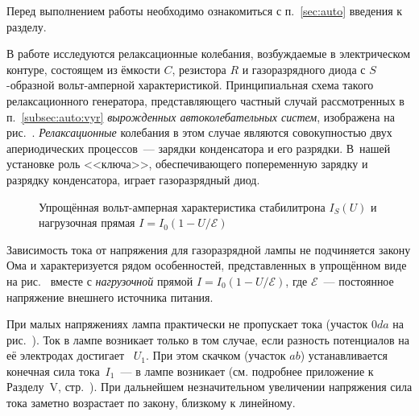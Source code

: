 


Перед выполнением работы необходимо ознакомиться с п.~\ref{sec:auto} 
введения к разделу.

В работе исследуются релаксационные колебания, возбуждаемые в электрическом
контуре, состоящем из ёмкости $C$, резистора $R$ и газоразрядного диода 
с $S$-образной вольт-амперной характеристикой. 
Принципиальная схема такого релаксационного генератора, представляющего 
частный случай рассмотренных в п.~\ref{subsec:auto:vyr}
\emph{вырожденных автоколебательных систем},
изображена на рис.~. \emph{Релаксационные} колебания в этом
случае являются совокупностью двух апериодических процессов~--- зарядки 
конденсатора и его разрядки. В~нашей установке роль <<ключа>>, обеспечивающего
попеременную зарядку и разрядку конденсатора, играет газоразрядный диод.

\begin{figure}[h!]
    \centering
    \caption{Упрощённая вольт-амперная характеристика стабилитрона $I_S(U)$
        и нагрузочная прямая $I=I_0(1-U/\mathcal{E})$}
\end{figure}

Зависимость тока от напряжения для газоразрядной лампы не подчиняется
закону Ома и характеризуется рядом особенностей, представленных
в упрощённом виде на рис.~ вместе с \emph{нагрузочной} прямой
$I=I_0 (1-U/\mathcal{E})$, где $\mathcal{E}$~--- постоянное напряжение 
внешнего источника питания.


При малых напряжениях лампа практически не пропускает тока 
(участок $0da$ на рис.~).
Ток в лампе возникает только в том случае, если разность потенциалов на её
электродах достигает ~$U_1$. 
При этом скачком (участок $ab$) устанавливается конечная 
сила тока~$I_1$~--- в лампе возникает
 (см. подробнее приложение к Разделу~V,
стр.~\pageref{sec:discharge}). 
При дальнейшем незначительном увеличении напряжения сила тока заметно возрастает 
по закону, близкому к линейному. 

